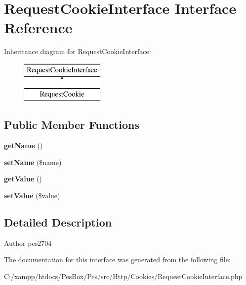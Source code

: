 \hypertarget{interface_pes_1_1_http_1_1_cookies_1_1_request_cookie_interface}{}\section{Request\+Cookie\+Interface Interface Reference}
\label{interface_pes_1_1_http_1_1_cookies_1_1_request_cookie_interface}
Inheritance diagram for Request\+Cookie\+Interface\+:\begin{figure}[H]
\begin{center}
\leavevmode
\includegraphics[height=2.000000cm]{interface_pes_1_1_http_1_1_cookies_1_1_request_cookie_interface}
\end{center}
\end{figure}
\subsection*{Public Member Functions}
\begin{DoxyCompactItemize}
\item 
\mbox{\label{interface_pes_1_1_http_1_1_cookies_1_1_request_cookie_interface_a3d0963e68bb313b163a73f2803c64600}} 
{\bfseries get\+Name} ()
\item 
\mbox{\label{interface_pes_1_1_http_1_1_cookies_1_1_request_cookie_interface_a2fe666694997d047711d7653eca2f132}} 
{\bfseries set\+Name} (\$name)
\item 
\mbox{\label{interface_pes_1_1_http_1_1_cookies_1_1_request_cookie_interface_ac0bc18784b182c89fcfd276625aef435}} 
{\bfseries get\+Value} ()
\item 
\mbox{\label{interface_pes_1_1_http_1_1_cookies_1_1_request_cookie_interface_a7494441b6ed08a391704971873f31432}} 
{\bfseries set\+Value} (\$value)
\end{DoxyCompactItemize}


\subsection{Detailed Description}
\begin{DoxyAuthor}{Author}
pes2704 
\end{DoxyAuthor}


The documentation for this interface was generated from the following file\+:\begin{DoxyCompactItemize}
\item 
C\+:/xampp/htdocs/\+Pes\+Box/\+Pes/src/\+Http/\+Cookies/Request\+Cookie\+Interface.\+php\end{DoxyCompactItemize}
